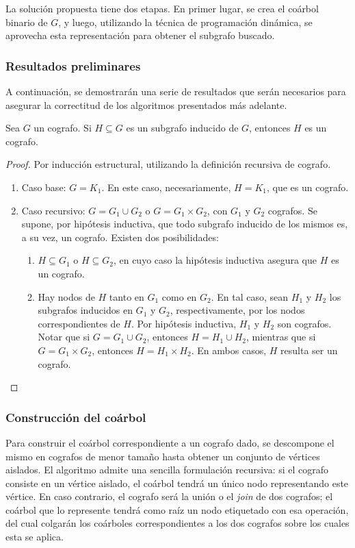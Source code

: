 La solución propuesta tiene dos etapas. En primer lugar, se crea el coárbol
binario de $G$, y luego, utilizando la técnica de programación dinámica, se
aprovecha esta representación para obtener el subgrafo buscado.

\subsubsection{Resultados preliminares}
A continuación, se demostrarán una serie de resultados que serán necesarios
para asegurar la correctitud de los algoritmos presentados más adelante.

\begin{lema} Sea $G$ un cografo. Si $H \subseteq G$ es un subgrafo inducido de
$G$, entonces $H$ es un cografo.
\end{lema}
\begin{proof}
Por inducción estructural, utilizando la definición recursiva de cografo.
\begin{enumerate}
    \item Caso base: $G = K_1$. En este caso, necesariamente, $H = K_1$, que
    es un cografo.
    \item Caso recursivo: $G = G_1 \cup G_2$ o $G = G_1 \times G_2$, con $G_1$
    y $G_2$ cografos. Se supone, por hipótesis inductiva, que todo subgrafo
    inducido de los mismos es, a su vez, un cografo. Existen dos
    posibilidades:
    \begin{enumerate}
        \item $H \subseteq G_1$ o $H \subseteq G_2$, en cuyo caso la hipótesis
    inductiva asegura que $H$ es un cografo.
        \item Hay nodos de $H$ tanto en $G_1$ como en $G_2$. En tal caso, sean
    $H_1$ y $H_2$ los subgrafos inducidos en $G_1$ y $G_2$, respectivamente,
    por los nodos correspondientes de $H$. Por hipótesis inductiva, $H_1$ y
    $H_2$ son cografos. Notar que si $G = G_1 \cup G_2$, entonces $H = H_1
    \cup H_2$, mientras que si $G = G_1 \times G_2$, entonces $H = H_1 \times
    H_2$. En ambos casos, $H$ resulta ser un cografo. \qedhere
    \end{enumerate}
\end{enumerate}
\end{proof}

\subsubsection{Construcción del coárbol}
Para construir el coárbol correspondiente a un cografo dado, se descompone el
mismo en cografos de menor tamaño hasta obtener un conjunto de vértices
aislados. El algoritmo admite una sencilla formulación recursiva: si el
cografo consiste en un vértice aislado, el coárbol tendrá un único nodo
representando este vértice. En caso contrario, el cografo será la unión o el
\emph{join} de dos cografos; el coárbol que lo represente tendrá como raíz un
nodo etiquetado con esa operación, del cual colgarán los coárboles
correspondientes a los dos cografos sobre los cuales esta se aplica.

